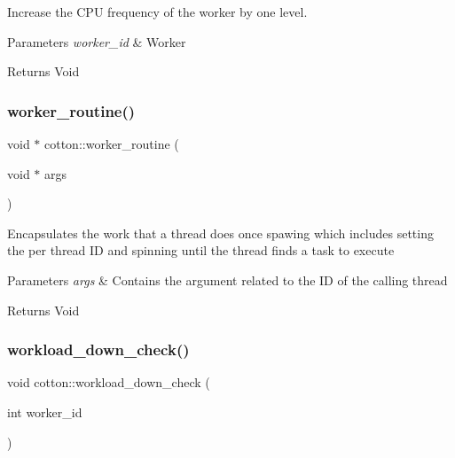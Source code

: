 Increase the C\+PU frequency of the worker by one level.


\begin{DoxyParams}{Parameters}
{\em worker\+\_\+id} & Worker\\
\hline
\end{DoxyParams}
\begin{DoxyReturn}{Returns}
Void 
\end{DoxyReturn}
\mbox{\label{cotton-runtime_8h_file_a361c34063ecb68cf02d417074decb12b}} 
\subsubsection{\texorpdfstring{worker\+\_\+routine()}{worker\_routine()}}
{\footnotesize\ttfamily void $\ast$ cotton\+::worker\+\_\+routine (\begin{DoxyParamCaption}\item[{void $\ast$}]{args }\end{DoxyParamCaption})}

Encapsulates the work that a thread does once spawing which includes setting the per thread ID and spinning until the thread finds a task to execute


\begin{DoxyParams}{Parameters}
{\em args} & Contains the argument related to the ID of the calling thread \\
\hline
\end{DoxyParams}
\begin{DoxyReturn}{Returns}
Void 
\end{DoxyReturn}
\mbox{\label{cotton-runtime_8h_file_adb1488633725b43a252652796faa2e98}} 
\subsubsection{\texorpdfstring{workload\+\_\+down\+\_\+check()}{workload\_down\_check()}}
{\footnotesize\ttfamily void cotton\+::workload\+\_\+down\+\_\+check (\begin{DoxyParamCaption}\item[{int}]{worker\+\_\+id }\end{DoxyParamCaption})}

